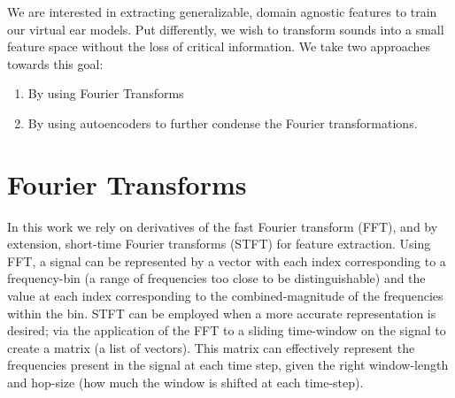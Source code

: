 \documentclass[\main/thesis.tex]{subfiles}
\begin{document}
We are interested in extracting generalizable, domain agnostic features to train our virtual ear models. Put differently, we wish to transform sounds into a small feature space without the loss of critical information. We take two approaches towards this goal: \begin{enumerate}
    \item By using Fourier Transforms \item By using autoencoders to further condense the Fourier transformations. 
\end{enumerate}

\section{Fourier Transforms}
In this work we rely on derivatives of the fast Fourier transform (FFT), and by extension, short-time Fourier transforms (STFT) for feature extraction. Using FFT, a signal can be represented by a vector with each index corresponding to a frequency-bin (a range of frequencies too close to be distinguishable) and the value at each index corresponding to the combined-magnitude of the frequencies within the bin. STFT can be employed when a more accurate representation is desired; via the application of the FFT to a sliding time-window on the signal to create a matrix (a list of vectors). This matrix can effectively represent the frequencies present in the signal at each time step, given the right window-length and hop-size (how much the window is shifted at each time-step).
\end{document}
